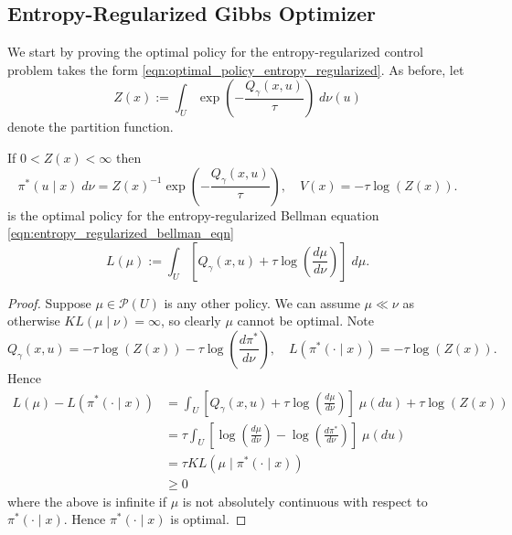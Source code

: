 \begin{subappendices}

\section{Entropy-Regularized Gibbs Optimizer}

We start by proving the optimal policy for the entropy-regularized
control problem takes the form \eqref{eqn:optimal_policy_entropy_regularized}. As before, let
%
\[Z(x) := \int_U \exp\left(-\frac{Q_\gamma(x,u)}{\tau}\right) \; d\nu(u)\]
%
\noindent denote the partition function.
%
\begin{lemma}
	If $0 < Z(x) < \infty$ then
		\[\pi^*(u \mid x) \; d\nu = Z(x)^{-1}\exp\left(-\frac{Q_\gamma(x,u)}{\tau} \right), \quad V(x) = -\tau \log(Z(x)).\]
	is the optimal policy for the entropy-regularized Bellman equation \eqref{eqn:entropy_regularized_bellman_eqn}
	\[L(\mu) := \int_U \left[Q_\gamma(x,u) + \tau \log\left(\frac{d\mu}{d\nu}\right)\right] \;  d\mu.\]
\end{lemma}
%
\begin{proof}
	Suppose $\mu \in \mathcal{P}(U)$ is any other policy. We can assume $\mu \ll \nu$ as otherwise
	$KL(\mu \mid \nu) = \infty$, so clearly $\mu$ cannot be optimal. Note
	\[Q_\gamma(x,u) = -\tau \log (Z(x)) - \tau \log\left(\frac{d\pi^*}{d\nu}\right), \quad L(\pi^*(\cdot \mid x)) = -\tau \log(Z(x)). \]
	\noindent Hence
	\begin{align*}
		L(\mu) - L(\pi^*(\cdot \mid x)) & = \int_U \left[Q_\gamma(x,u) + \tau \log\left(\frac{d\mu}{d\nu}\right)\right] \; \mu(du) + \tau \log(Z(x))\\
		& = \tau \int_U \left[\log\left(\frac{d\mu}{d\nu}\right) - \log\left(\frac{d\pi^*}{d\nu}\right)\right] \; \mu(du)\\
		& = \tau KL(\mu \mid \pi^*(\cdot \mid x))\\
		& \geq 0
	\end{align*}
	\noindent where the above is infinite if $\mu$ is not absolutely continuous with respect to $\pi^*(\cdot \mid x)$. Hence $\pi^*(\cdot \mid x)$ is optimal.
\end{proof}

\end{subappendices}
